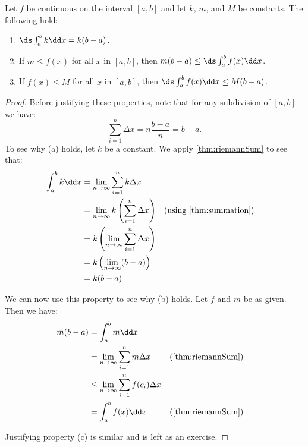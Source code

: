 \begin{theorem}\label{thm:further_def_int_props}%
Let $f$ be continuous on the interval $[a,b]$ and let $k$, $m$, and $M$ be constants. The following hold:
\begin{enumerate}
\item $\ds\int_a^b k\dd x=k(b-a)$.
\item If $m\leq f(x)$ for all $x$ in $[a,b]$, then $m(b-a)\leq \ds\int_a^b f(x)\dd x$.
\item If $f(x)\leq M$ for all $x$ in $[a,b]$, then $\ds\int_a^b f(x)\dd x\leq M(b-a)$.
\end{enumerate}
\end{theorem}

\begin{proof}
Before justifying these properties, note that for any subdivision of $[a,b]$ we have: \[\sum_{i=1}^n \Delta x=n\frac{b-a}n=b-a.\]
To see why (a) holds, let $k$ be a constant. We apply \autoref{thm:riemannSum} to see that:
\begin{align*}
\int_a^b k\dd x &=\lim_{n\to\infty}\sum_{i=1}^n k\Delta x\\
&=\lim_{n\to\infty}k\left( \sum_{i=1}^n \Delta x\right)
&&\text{(using \autoref{thm:summation})}\\
&=k\left(\lim_{n\to\infty}\sum_{i=1}^n \Delta x\right)\\
&=k\left( \lim_{n\to\infty} (b-a)\right)\\
&=k(b-a)
\end{align*}

We can now use this property to see why (b) holds. Let $f$ and $m$ be as given. Then we have:
\begin{align*}
m(b-a)&=\int_a^b m\dd x \\
&=\lim_{n\to\infty}\sum_{i=1}^n m\Delta x
&&\text{(\autoref{thm:riemannSum})}\\
&\leq \lim_{n\to\infty}\sum_{i=1}^n f(c_i)\Delta x\\
&=\int_a^b f(x)\dd x &&\text{(\autoref{thm:riemannSum})}
\end{align*}

Justifying property (c) is similar and is left as an exercise.
\end{proof}

